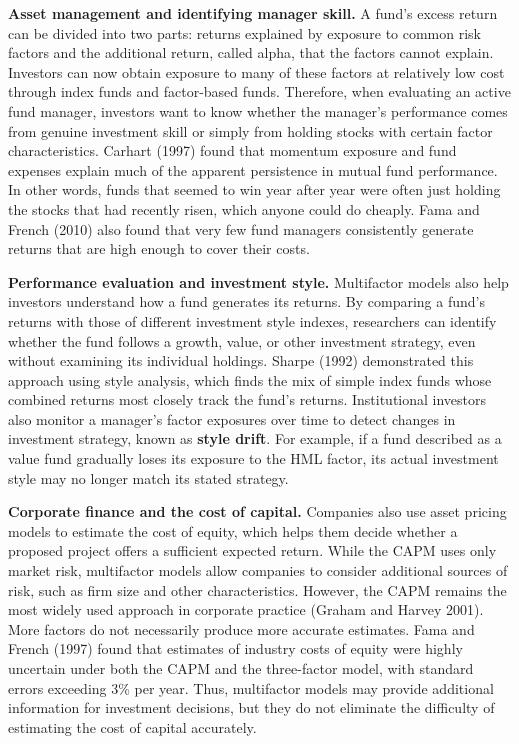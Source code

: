 \textbf{Asset management and identifying manager skill.}
A fund's excess return can be divided into two parts: returns
explained by exposure to common risk factors and the additional
return, called alpha, that the factors cannot explain. Investors
can now obtain exposure to many of these factors at relatively
low cost through index funds and factor-based funds. Therefore,
when evaluating an active fund manager, investors want to know
whether the manager's performance comes from genuine investment
skill or simply from holding stocks with certain factor
characteristics. Carhart (1997) found that momentum exposure and
fund expenses explain much of the apparent persistence in mutual
fund performance. In other words, funds that seemed to win year
after year were often just holding the stocks that had recently
risen, which anyone could do cheaply. Fama and French (2010) also found that very few
fund managers consistently generate returns that are high enough
to cover their costs.

\textbf{Performance evaluation and investment style.}
Multifactor models also help investors understand how a fund
generates its returns. By comparing a fund's returns with those
of different investment style indexes, researchers can identify
whether the fund follows a growth, value, or other investment
strategy, even without examining its individual holdings.
Sharpe (1992) demonstrated this approach using style analysis, which finds the mix of simple index funds whose combined returns most closely track the fund's returns.
Institutional investors also monitor a manager's factor exposures
over time to detect changes in investment strategy, known as
\textbf{style drift}. For example, if a
fund described as a value fund gradually loses its exposure to
the HML factor, its actual investment style may no longer match
its stated strategy.

\textbf{Corporate finance and the cost of capital.}
Companies also use asset pricing models to estimate the cost of
equity, which helps them decide whether a proposed project offers
a sufficient expected return. While the CAPM uses only market
risk, multifactor models allow companies to consider additional
sources of risk, such as firm size and other characteristics.
However, the CAPM remains the most widely used approach in
corporate practice (Graham and Harvey 2001). More factors do not
necessarily produce more accurate estimates. Fama and French
(1997) found that estimates of industry costs of equity were
highly uncertain under both the CAPM and the three-factor model,
with standard errors exceeding 3\% per year. Thus, multifactor
models may provide additional information for investment
decisions, but they do not eliminate the difficulty of estimating
the cost of capital accurately.


